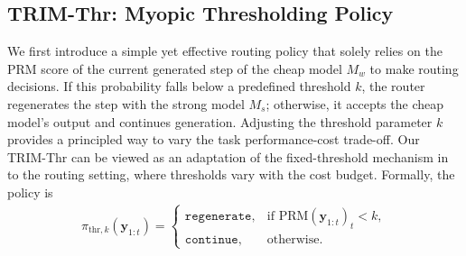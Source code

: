 \documentclass{article}
\theoremstyle{plain}
\theoremstyle{definition}
\theoremstyle{remark}
\newcommand{\cont}{\mathtt{continue}}
\newcommand{\regen}{\mathtt{regenerate}}
\begin{document}
\subsection{TRIM-Thr: Myopic Thresholding Policy}
\vspace{-0.1cm}
We first introduce a simple yet effective routing policy that solely relies on the PRM score of the current generated step of the cheap model $M_w$ to make routing decisions. If this probability falls below a predefined threshold $k$, the router regenerates the step with the strong model $M_s$; otherwise, it accepts the cheap model’s output and continues generation. Adjusting the threshold parameter $k$ provides a principled way to vary the task performance-cost trade-off. Our TRIM-Thr can be viewed as an adaptation of the fixed-threshold mechanism in~\citet{RSD} 
to the routing setting, where thresholds vary with the cost budget. Formally, the policy is 
\begin{align}\pi_{\text{thr}, k}(\mathbf{y}_{1:t}) = \begin{cases}
\regen, & \text{if } \text{PRM}(\mathbf{y}_{1:t})_t < k, \\
\cont, & \text{otherwise}.
\end{cases}\end{align}
\vspace{-0.2cm}
\end{document}
